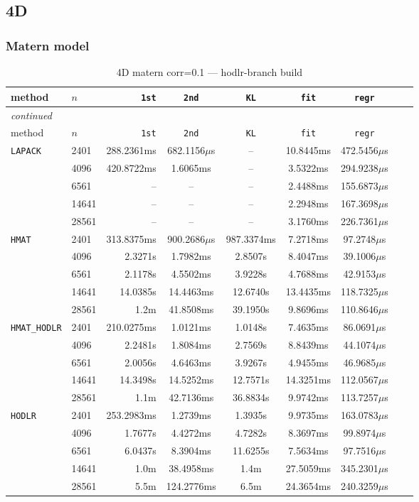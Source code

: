 \documentclass[11pt,a4paper]{article}
\begin{document}
\subsection{4D}
\subsubsection*{Matern model}
\begin{center}
\begin{longtable}{llrcccccc}
\caption{4D matern corr=0.1 --- hodlr-branch build}
\\\toprule
method & $n$ & \texttt{1st} & \texttt{2nd} & \texttt{KL} & \texttt{fit} & \texttt{regr}\\
\midrule
\endfirsthead
\multicolumn{8}{l}{\small\emph{continued}}\\
\toprule
method & $n$ & \texttt{1st} & \texttt{2nd} & \texttt{KL} & \texttt{fit} & \texttt{regr}\\
\midrule
\endhead

\texttt{LAPACK} & 2401 & 288.2361ms & 682.1156$\mu$s & -- & 10.8445ms & 472.5456$\mu$s\\
 & 4096 & 420.8722ms & 1.6065ms & -- & 3.5322ms & 294.9238$\mu$s\\
 & 6561 & -- & -- & -- & 2.4488ms & 155.6873$\mu$s\\
 & 14641 & -- & -- & -- & 2.2948ms & 167.3698$\mu$s\\
 & 28561 & -- & -- & -- & 3.1760ms & 226.7361$\mu$s\\
\texttt{HMAT} & 2401 & 313.8375ms & 900.2686$\mu$s & 987.3374ms & 7.2718ms & 97.2748$\mu$s\\
 & 4096 & 2.3271s & 1.7982ms & 2.8507s & 8.4047ms & 39.1006$\mu$s\\
 & 6561 & 2.1178s & 4.5502ms & 3.9228s & 4.7688ms & 42.9153$\mu$s\\
 & 14641 & 14.0385s & 14.4463ms & 12.6740s & 13.4435ms & 118.7325$\mu$s\\
 & 28561 & 1.2m & 41.8508ms & 39.1950s & 9.8696ms & 110.8646$\mu$s\\
\texttt{HMAT\_HODLR} & 2401 & 210.0275ms & 1.0121ms & 1.0148s & 7.4635ms & 86.0691$\mu$s\\
 & 4096 & 2.2481s & 1.8084ms & 2.7569s & 8.8439ms & 44.1074$\mu$s\\
 & 6561 & 2.0056s & 4.6463ms & 3.9267s & 4.9455ms & 46.9685$\mu$s\\
 & 14641 & 14.3498s & 14.5252ms & 12.7571s & 14.3251ms & 112.0567$\mu$s\\
 & 28561 & 1.1m & 42.7136ms & 36.8834s & 9.9742ms & 113.7257$\mu$s\\
\texttt{HODLR} & 2401 & 253.2983ms & 1.2739ms & 1.3935s & 9.9735ms & 163.0783$\mu$s\\
 & 4096 & 1.7677s & 4.4272ms & 4.7282s & 8.3697ms & 99.8974$\mu$s\\
 & 6561 & 6.0437s & 8.3904ms & 11.6255s & 7.5634ms & 97.7516$\mu$s\\
 & 14641 & 1.0m & 38.4958ms & 1.4m & 27.5059ms & 345.2301$\mu$s\\
 & 28561 & 5.5m & 124.2776ms & 6.5m & 24.3654ms & 240.3259$\mu$s\\
\bottomrule\end{longtable}\end{center}
\end{document}

